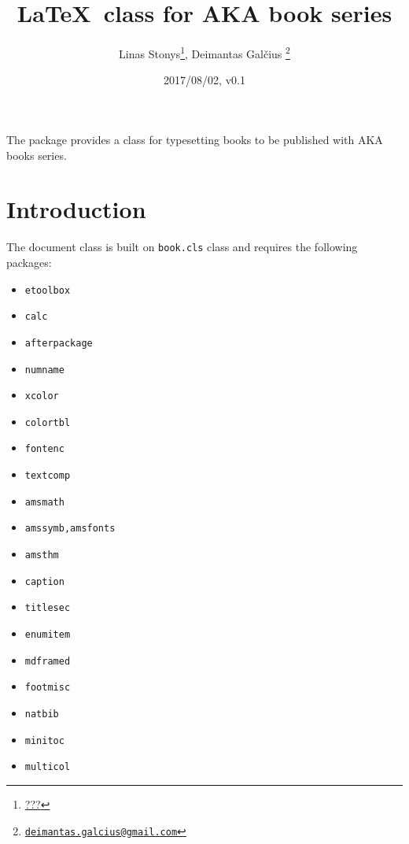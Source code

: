\documentclass{ltxdoc}
\def\file#1{\texttt{#1}}
\begin{document}
\title{\LaTeX\ class for AKA book  series}
\author%
    {%
      Linas Stonys\footnote{\href{mailto:???}{???}},
      \space
      Deimantas Gal\v{c}ius%
      \footnote{\href{mailto:deimantas.galcius@gmail.com}{\texttt{deimantas.galcius@gmail.com}}}
    }
\date{2017/08/02, v0.1}
\maketitle

\abstract%
    {%
      The package provides a class for typesetting books
      to be published with AKA books series.
    }

\tableofcontents

\section{Introduction}

The document class is built on \file{book.cls} class and requires the following packages:

\begin{multicols}{2}
\begin{itemize}
\item \file{etoolbox}
\item \file{calc}
\item \file{afterpackage}
\item \file{numname}
\item \file{xcolor}
\item \file{colortbl}
\item \file{fontenc}
\item \file{textcomp}
\item \file{amsmath}
\item \file{amssymb,amsfonts}
\item \file{amsthm}
\item \file{caption}
\item \file{titlesec}
\item \file{enumitem}
\item \file{mdframed}
\item \file{footmisc}
\item \file{natbib}
\item \file{minitoc}
\item \file{multicol}
\end{itemize}
\end{multicols}
\end{document}
